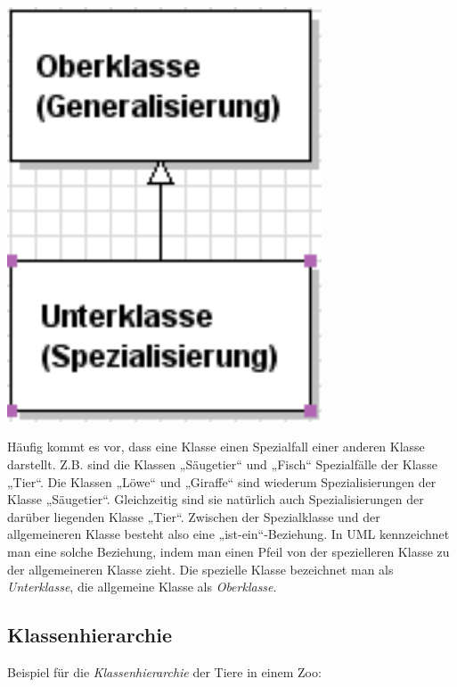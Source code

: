 \begin{minipage}{0.25\textwidth}
\begin{center}
\includegraphics[width=0.7\textwidth]{./inf/SEKII/15_UML_Klassendiagramme/Vererbungsbeziehung.png}
\end{center}
\end{minipage}
\begin{minipage}{0.75\textwidth}
Häufig kommt es vor, dass eine Klasse einen Spezialfall einer anderen Klasse
darstellt. Z.B. sind die Klassen „Säugetier“ und „Fisch“ Spezialfälle der Klasse
„Tier“. Die Klassen „Löwe“ und „Giraffe“ sind wiederum Spezialisierungen der
Klasse „Säugetier“. Gleichzeitig sind sie natürlich auch Spezialisierungen der
darüber liegenden Klasse „Tier“. Zwischen der Spezialklasse und der
allgemeineren Klasse besteht also eine „ist-ein“-Beziehung. In UML kennzeichnet
man eine solche Beziehung, indem man einen Pfeil von der spezielleren Klasse zu
der allgemeineren Klasse zieht. Die spezielle Klasse bezeichnet man als
\emph{Unterklasse}, die allgemeine Klasse als \emph{Oberklasse}.
\end{minipage}


\subsection{Klassenhierarchie}

Beispiel für die \emph{Klassenhierarchie} der Tiere in einem Zoo:

